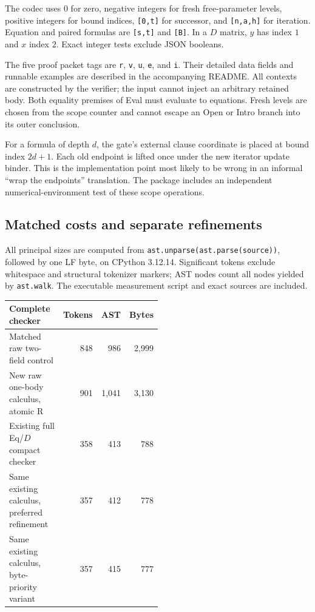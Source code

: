 \documentclass[11pt]{article}
\theoremstyle{definition}
\theoremstyle{remark}
\begin{document}
The codec uses $0$ for zero, negative integers for fresh free-parameter
levels, positive integers for bound indices, \texttt{[0,t]} for successor,
and \texttt{[n,a,h]} for iteration. Equation and paired formulas are
\texttt{[s,t]} and \texttt{[B]}. In a $D$ matrix, $y$ has index $1$
and $x$ index $2$. Exact integer tests exclude JSON booleans.

The five proof packet tags are \texttt{r}, \texttt{v}, \texttt{u},
\texttt{e}, and \texttt{i}. Their detailed data fields and runnable
examples are described in the accompanying README. All contexts are
constructed by the verifier; the input cannot inject an arbitrary
retained body. Both equality premises of Eval must evaluate to equations.
Fresh levels are chosen from the scope counter and cannot escape an
Open or Intro branch into its outer conclusion.

For a formula of depth $d$, the gate's external clause coordinate is
placed at bound index $2d+1$. Each old endpoint is lifted once under
the new iterator update binder. This is the implementation point most
likely to be wrong in an informal ``wrap the endpoints'' translation.
The package includes an independent numerical-environment test of these
scope operations.

\subsection{Matched costs and separate refinements}

All principal sizes are computed from
\texttt{ast.unparse(ast.parse(source))}, followed by one LF byte, on
CPython 3.12.14.
Significant tokens exclude whitespace and structural tokenizer markers;
AST nodes count all nodes yielded by \texttt{ast.walk}. The executable
measurement script and exact sources are included.

\begin{center}
\begin{tabular}{p{0.50\linewidth}rrr}
\toprule
Complete checker & Tokens & AST & Bytes\\
\midrule
Matched raw two-field control & 848 & 986 & 2,999\\
New raw one-body calculus, atomic R & 901 & 1,041 & 3,130\\
Existing full Eq/$D$ compact checker & 358 & 413 & 788\\
Same existing calculus, preferred refinement & 357 & 412 & 778\\
Same existing calculus, byte-priority variant & 357 & 415 & 777\\
\bottomrule
\end{tabular}
\end{center}
\end{document}
